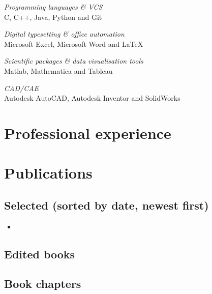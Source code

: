 \documentclass[11pt]{article}
\begin{document}
{\sl Programming languages \& VCS} \\ 
C, C++, Java, Python and Git

{\sl Digital typesetting \& office automation} \\ 
Microsoft Excel, Microsoft Word and \LaTeX

{\sl Scientific packages \& data visualisation tools}\\
Matlab, Mathematica and Tableau

{\sl CAD/CAE} \\ 
Autodesk AutoCAD, Autodesk Inventor and SolidWorks

\vspace{0.2in} %

\section*{Professional experience} 



\section*{Publications} 

\subsection*{Selected (sorted by date, newest first)}

\begin{itemize}[label={}]
	\item {}
\end{itemize}

\subsection*{Edited books}

\begin{enumerate}[label={[\arabic*]}]
	\item {}
\end{enumerate}

\subsection*{Book chapters}

\begin{enumerate}[label={[\arabic*]}]
	\item {}
	\item {}
\end{enumerate}
\end{document}
